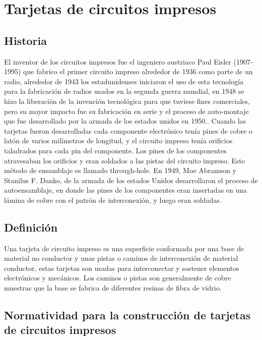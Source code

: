 \documentclass[a4paper,12pt,twoside]{proyectotanquesecci}
\begin{document}
\appendix

\chapter{Tarjetas de circuitos impresos}

\section{Historia}

El inventor de los circuitos impresos fue el ingeniero austriaco Paul Eisler (1907-1995) que fabrico el primer circuito impreso alrededor de 1936 como parte de un radio, alrededor  de 1943 los estadunidenses iniciaron el uso de esta tecnología para la fabricación de radios  usados en la segunda guerra mundial, en 1948 se hizo la liberación de la invención tecnológica para que tuviese fines comerciales, pero su mayor impacto fue su fabricación en serie y el proceso de auto-montaje  que fue desarrollado por la  armada de los estados unidos en  1950..
Cuando las tarjetas fueron desarrolladas cada componente electrónico tenía pines de cobre o latón de varios milímetros de longitud, y el circuito impreso tenía orificios taladrados para cada pin del componente. Los pines de los componentes atravesaban los orificios y eran soldados a las pistas del circuito impreso. Este método de ensamblaje es llamado through-hole.
En 1949, Moe Abramson y Stanilus F. Danko, de la armada de  los estados Unidos desarrollaron el proceso de autoensamblaje, en donde las pines de los componentes eran insertadas en una lámina de cobre con el patrón de interconexión, y luego eran soldadas.

\section{Definición}

Una tarjeta de circuito impreso es una superficie conformada por una base de material no conductor y unas pistas o caminos de interconexión de material conductor, estas tarjetas son usadas para interconectar y sostener elementos electrónicos y mecánicos.
Los caminos o pistas son generalmente  de cobre  muestras que la base se fabrica de diferentes resinas de fibra de vidrio.

\section{Normatividad para la construcción de  tarjetas de circuitos impresos}
\end{document}
